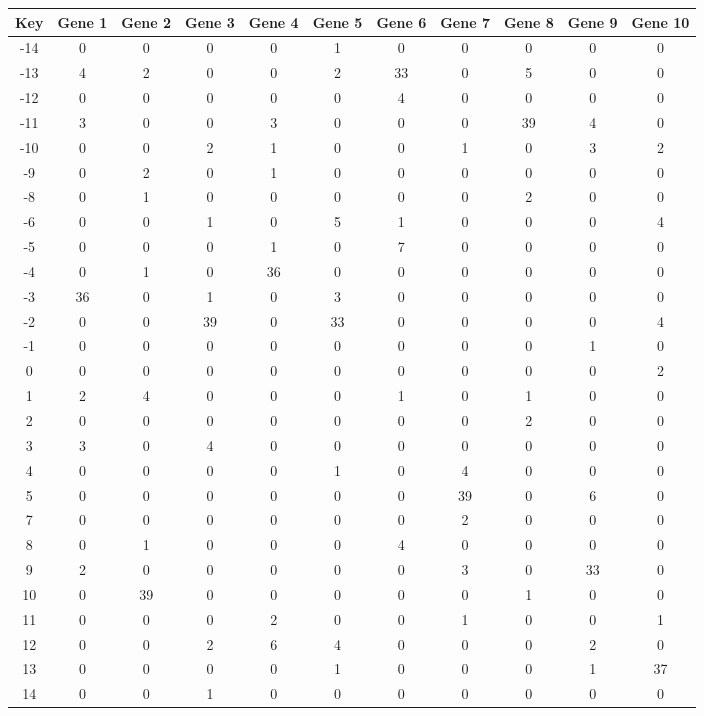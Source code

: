 \begin{tabular}{|c|c|c|c|c|c|c|c|c|c|c|}
\hline
Key & Gene 1 & Gene 2 & Gene 3 & Gene 4 & Gene 5 & Gene 6 & Gene 7 & Gene 8 & Gene 9 & Gene 10 \\
\hline
-14 & 0 & 0 & 0 & 0 & 1 & 0 & 0 & 0 & 0 & 0 \\
-13 & 4 & 2 & 0 & 0 & 2 & 33 & 0 & 5 & 0 & 0 \\
-12 & 0 & 0 & 0 & 0 & 0 & 4 & 0 & 0 & 0 & 0 \\
-11 & 3 & 0 & 0 & 3 & 0 & 0 & 0 & 39 & 4 & 0 \\
-10 & 0 & 0 & 2 & 1 & 0 & 0 & 1 & 0 & 3 & 2 \\
-9 & 0 & 2 & 0 & 1 & 0 & 0 & 0 & 0 & 0 & 0 \\
-8 & 0 & 1 & 0 & 0 & 0 & 0 & 0 & 2 & 0 & 0 \\
-6 & 0 & 0 & 1 & 0 & 5 & 1 & 0 & 0 & 0 & 4 \\
-5 & 0 & 0 & 0 & 1 & 0 & 7 & 0 & 0 & 0 & 0 \\
-4 & 0 & 1 & 0 & 36 & 0 & 0 & 0 & 0 & 0 & 0 \\
-3 & 36 & 0 & 1 & 0 & 3 & 0 & 0 & 0 & 0 & 0 \\
-2 & 0 & 0 & 39 & 0 & 33 & 0 & 0 & 0 & 0 & 4 \\
-1 & 0 & 0 & 0 & 0 & 0 & 0 & 0 & 0 & 1 & 0 \\
0 & 0 & 0 & 0 & 0 & 0 & 0 & 0 & 0 & 0 & 2 \\
1 & 2 & 4 & 0 & 0 & 0 & 1 & 0 & 1 & 0 & 0 \\
2 & 0 & 0 & 0 & 0 & 0 & 0 & 0 & 2 & 0 & 0 \\
3 & 3 & 0 & 4 & 0 & 0 & 0 & 0 & 0 & 0 & 0 \\
4 & 0 & 0 & 0 & 0 & 1 & 0 & 4 & 0 & 0 & 0 \\
5 & 0 & 0 & 0 & 0 & 0 & 0 & 39 & 0 & 6 & 0 \\
7 & 0 & 0 & 0 & 0 & 0 & 0 & 2 & 0 & 0 & 0 \\
8 & 0 & 1 & 0 & 0 & 0 & 4 & 0 & 0 & 0 & 0 \\
9 & 2 & 0 & 0 & 0 & 0 & 0 & 3 & 0 & 33 & 0 \\
10 & 0 & 39 & 0 & 0 & 0 & 0 & 0 & 1 & 0 & 0 \\
11 & 0 & 0 & 0 & 2 & 0 & 0 & 1 & 0 & 0 & 1 \\
12 & 0 & 0 & 2 & 6 & 4 & 0 & 0 & 0 & 2 & 0 \\
13 & 0 & 0 & 0 & 0 & 1 & 0 & 0 & 0 & 1 & 37 \\
14 & 0 & 0 & 1 & 0 & 0 & 0 & 0 & 0 & 0 & 0 \\
\hline
\end{tabular}
